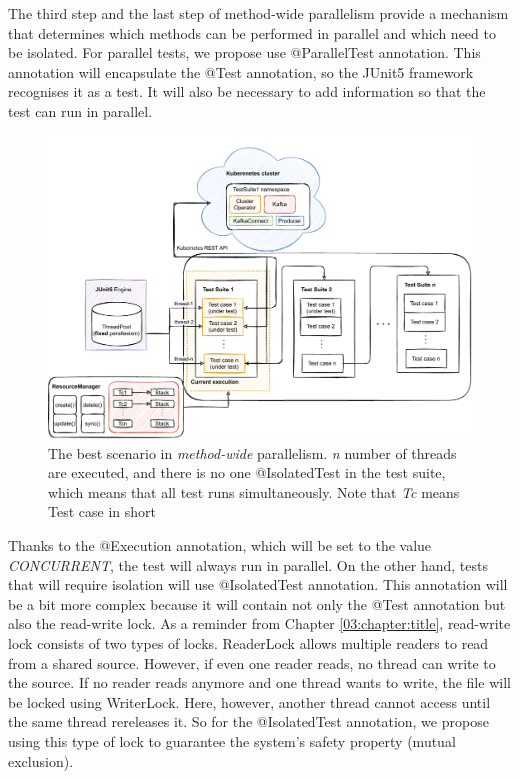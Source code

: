The third step and the last step of method-wide parallelism provide a mechanism that determines which methods can be performed in parallel and which need to be isolated. For parallel tests, we propose use @ParallelTest annotation. This annotation will encapsulate the @Test annotation, so the JUnit5 framework recognises it as a test. It will also be necessary to add information so that the test can run in parallel.
\begin{figure}[!ht]
    \centering
    \includegraphics[scale=0.7]{obrazky-figures/06-proposal-of-parallel-approach/03b-method-wide-with-resource-manager.pdf}
    \caption{The best scenario in \emph{method-wide} parallelism. \emph{n} number of threads are executed, and there is no one @IsolatedTest in the test suite, which means that all test runs simultaneously. Note that \emph{Tc} means Test case in short}
    \label{05:fig:methodwideparallelism}
\end{figure}
Thanks to the @Execution annotation, which will be set to the value \emph{CONCURRENT}, the test will always run in parallel. On the other hand, tests that will require isolation will use @IsolatedTest annotation. This annotation will be a bit more complex because it will contain not only the @Test annotation but also the read-write lock. As a reminder from Chapter \ref{03:chapter:title}, read-write lock consists of two types of locks. ReaderLock allows multiple readers to read from a shared source. However, if even one reader reads, no thread can write to the source. If no reader reads anymore and one thread wants to write, the file will be locked using WriterLock. Here, however, another thread cannot access until the same thread rereleases it. So for the @IsolatedTest annotation, we propose using this type of lock to guarantee the system's safety property (mutual exclusion).

